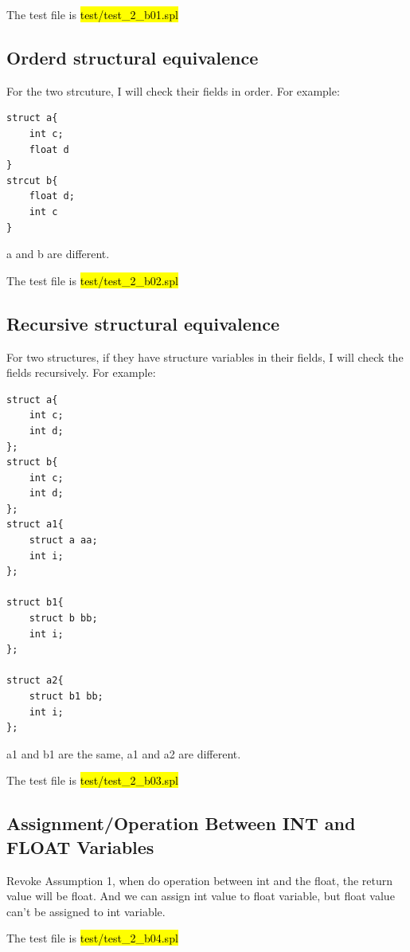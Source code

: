 \documentclass{article}
\begin{document}
            The test file is \hl{test/test\_2\_b01.spl}

        \subsection{Orderd structural equivalence}
            For the two strcuture, I will check their fields in order. For example:

            \begin{lstlisting}[]
struct a{
    int c; 
    float d
}
strcut b{
    float d; 
    int c
}
            \end{lstlisting}

                a and b are different.

                The test file is \hl{test/test\_2\_b02.spl}

        \subsection{Recursive structural equivalence}
            For two structures, if they have structure variables in their fields, I will check the fields recursively. For example:
            
            \begin{lstlisting}
struct a{
    int c;
    int d;
};
struct b{
    int c;
    int d;
};
struct a1{
    struct a aa;
    int i;
};

struct b1{
    struct b bb;
    int i;
};

struct a2{
    struct b1 bb;
    int i;
};
            \end{lstlisting}

            a1 and b1 are the same, a1 and a2 are different.

            The test file is \hl{test/test\_2\_b03.spl}
        \subsection{Assignment/Operation Between INT and FLOAT Variables}
            Revoke Assumption 1, when do operation between int and the float, the return value will be float. 
            And we can assign int value to float variable, but float value can't be assigned to int variable. 
            
            The test file is \hl{test/test\_2\_b04.spl}
\end{document}
